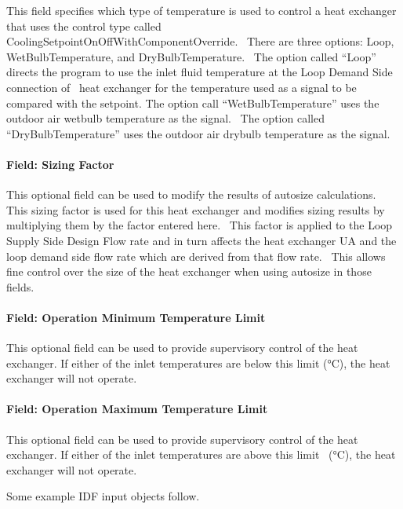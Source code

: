 This field specifies which type of temperature is used to control a heat exchanger that uses the control type called CoolingSetpointOnOffWithComponentOverride.~ There are three options: Loop, WetBulbTemperature, and DryBulbTemperature.~ The option called ``Loop'' directs the program to use the inlet fluid temperature at the Loop Demand Side connection of~ heat exchanger for the temperature used as a signal to be compared with the setpoint. The option call ``WetBulbTemperature'' uses the outdoor air wetbulb temperature as the signal.~ The option called ``DryBulbTemperature'' uses the outdoor air drybulb temperature as the signal.

\paragraph{Field: Sizing Factor}\label{field-sizing-factor-4}

This optional field can be used to modify the results of autosize calculations.~ This sizing factor is used for this heat exchanger and modifies sizing results by multiplying them by the factor entered here.~ This factor is applied to the Loop Supply Side Design Flow rate and in turn affects the heat exchanger UA and the loop demand side flow rate which are derived from that flow rate.~ This allows fine control over the size of the heat exchanger when using autosize in those fields.

\paragraph{Field: Operation Minimum Temperature Limit}\label{field-operation-minimum-temperature-limit}

This optional field can be used to provide supervisory control of the heat exchanger. If either of the inlet temperatures are below this limit (°C), the heat exchanger will not operate.

\paragraph{Field: Operation Maximum Temperature Limit}\label{field-operation-maximum-temperature-limit}

This optional field can be used to provide supervisory control of the heat exchanger. If either of the inlet temperatures are above this limit~ (°C), the heat exchanger will not operate.

Some example IDF input objects follow.

